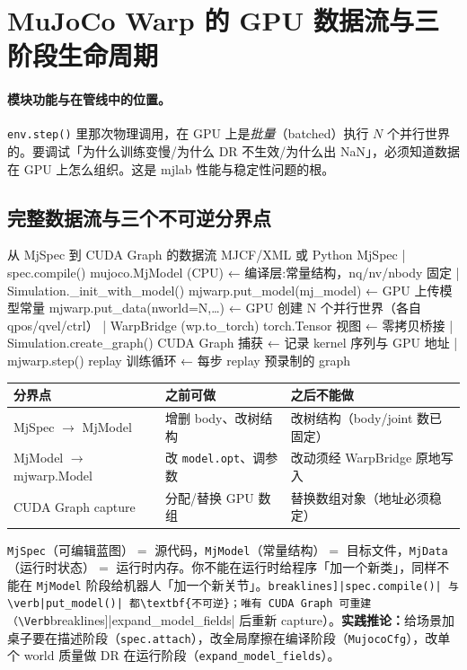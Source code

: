 \section{MuJoCo Warp 的 GPU 数据流与三阶段生命周期}
\label{sec:rlmc-phys-dataflow}

\paragraph{模块功能与在管线中的位置。}\verb|env.step()| 里那次物理调用，在 GPU 上是\emph{批量}（batched）执行 $N$ 个并行世界的。要调试「为什么训练变慢/为什么 DR 不生效/为什么出 NaN」，必须知道数据在 GPU 上怎么组织。这是 mjlab 性能与稳定性问题的根。

\subsection{完整数据流与三个不可逆分界点}

\begin{codebox}[text]{从 MjSpec 到 CUDA Graph 的数据流}
MJCF/XML 或 Python MjSpec
  | spec.compile()
mujoco.MjModel (CPU)         ← 编译层:常量结构，nq/nv/nbody 固定
  | Simulation._init_with_model()
mjwarp.put_model(mj_model)   ← GPU 上传模型常量
mjwarp.put_data(nworld=N,…)  ← GPU 创建 N 个并行世界（各自 qpos/qvel/ctrl）
  | WarpBridge (wp.to_torch)
torch.Tensor 视图            ← 零拷贝桥接
  | Simulation.create_graph()
CUDA Graph 捕获              ← 记录 kernel 序列与 GPU 地址
  | mjwarp.step() replay
训练循环                     ← 每步 replay 预录制的 graph
\end{codebox}

\begin{center}
\small
\begin{tabular}{@{}lp{3.4cm}p{3.4cm}@{}}
\toprule
分界点 & 之前可做 & 之后不能做 \\
\midrule
MjSpec $\to$ MjModel & 增删 body、改树结构 & 改树结构（body/joint 数已固定） \\
MjModel $\to$ mjwarp.Model & 改 \verb|model.opt|、调参数 & 改动须经 WarpBridge 原地写入 \\
CUDA Graph capture & 分配/替换 GPU 数组 & 替换数组对象（地址必须稳定） \\
\bottomrule
\end{tabular}
\end{center}

\begin{insight}\label{ins:rlmc-phys-lifecycle}
\verb|MjSpec|（可编辑蓝图）$=$ 源代码，\verb|MjModel|（常量结构）$=$ 目标文件，\verb|MjData|（运行时状态）$=$ 运行时内存。你不能在运行时给程序「加一个新类」，同样不能在 \verb|MjModel| 阶段给机器人「加一个新关节」。\Verb[breaklines]|spec.compile()| 与 \verb|put_model()| 都\textbf{不可逆}；唯有 CUDA Graph 可重建（\Verb[breaklines]|expand_model_fields| 后重新 capture）。\textbf{实践推论：}给场景加桌子要在描述阶段（\texttt{spec.attach}），改全局摩擦在编译阶段（\texttt{MujocoCfg}），改单个 world 质量做 DR 在运行阶段（\texttt{expand\_model\_fields}）。
\end{insight}

